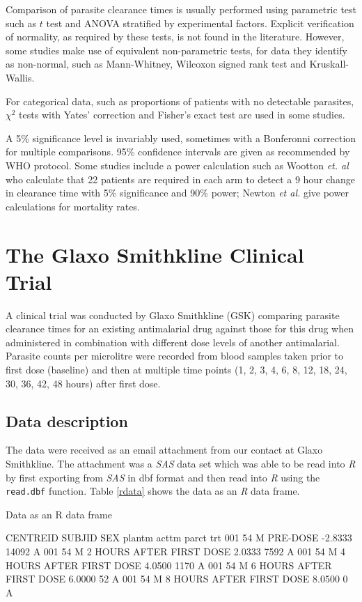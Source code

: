 Comparison of parasite clearance times is usually performed using parametric test such as $t$ test and ANOVA stratified by experimental factors\cite{vries, smithuis, wootton, carmello}. Explicit verification of normality, as required by these tests, is not found in the literature. However, some studies make use of equivalent non-parametric tests, for data they identify as non-normal, such as Mann-Whitney, Wilcoxon signed rank test\cite{carmello, newton} and Kruskall-Wallis\cite{pukri}.\label{stat-tests}

For categorical data, such as proportions of patients with no detectable parasites, $\chi^{2}$ tests with Yates' correction and Fisher's exact test are used in some studies\cite{newton, smithuis}.

A 5\% significance level is invariably used, sometimes with a Bonferonni correction for multiple comparisons. 95\% confidence intervals are given as recommended by WHO protocol\cite{protocolWHO}. Some studies include a power calculation such as Wootton \textit{et. al}\cite{wootton} who calculate that 22 patients are required in each arm to detect a 9 hour change in clearance time with 5\% significance and 90\% power; Newton \textit{et al.}\cite{newton} give power calculations for mortality rates.
\section{The Glaxo Smithkline Clinical Trial}
A clinical trial was conducted by Glaxo Smithkline (GSK) comparing parasite clearance times for an existing antimalarial drug against those for this drug when administered in combination with different dose levels of another antimalarial. Parasite counts per microlitre were recorded from blood samples taken prior to first dose (baseline) and then at multiple time points (1, 2, 3, 4, 6, 8, 12, 18, 24, 30, 36, 42, 48 hours) after first dose.

\subsection{Data description}
The data were received as an email attachment from our contact at Glaxo Smithkline. The attachment was a \emph{SAS} data set which was able to be read into \emph{R} by first exporting from \emph{SAS} in dbf format and then read into \emph{R} using the \texttt{read.dbf} function.
Table \ref{rdata} shows the data as an \emph{R} data frame. 
\begin{table}[h]
\centering
\caption{Data as an R data frame}\label{rdata}
\begin{boxedverbatim}
CENTREID SUBJID SEX                    plantm   acttm  parct trt
     001     54   M                  PRE-DOSE -2.8333  14092   A  
     001     54   M  2 HOURS AFTER FIRST DOSE  2.0333   7592   A  
     001     54   M  4 HOURS AFTER FIRST DOSE  4.0500   1170   A  
     001     54   M  6 HOURS AFTER FIRST DOSE  6.0000     52   A  
     001     54   M  8 HOURS AFTER FIRST DOSE  8.0500      0   A  
\end{boxedverbatim}
\end{table}


